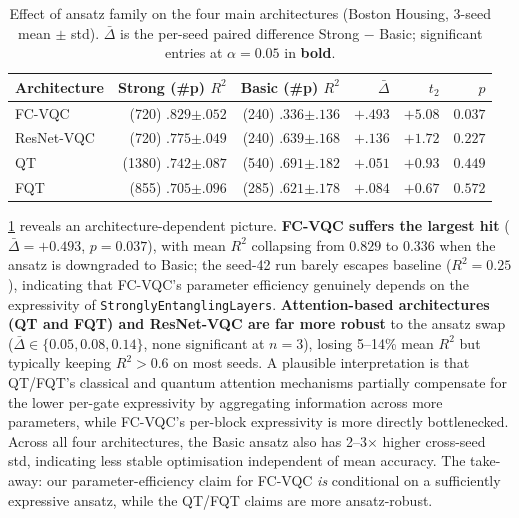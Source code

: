 \documentclass[10pt,conference]{IEEEtran}
\begin{document}
\begin{table}[t]
\centering
\caption{Effect of ansatz family on the four main architectures (Boston Housing, 3-seed mean $\pm$ std). $\bar{\Delta}$ is the per-seed paired difference Strong $-$ Basic; significant entries at $\alpha{=}0.05$ in \textbf{bold}.}
\label{tab:ansatz}
\small
\begin{tabular}{lrrrrr}
\toprule
Architecture & Strong (\#p) $R^2$ & Basic (\#p) $R^2$ & $\bar{\Delta}$ & $t_{2}$ & $p$ \\
\midrule
FC-VQC      & (720) $.829{\scriptstyle\pm.052}$ & (240) $.336{\scriptstyle\pm.136}$ & $\mathbf{+.493}$ & $\mathbf{+5.08}$ & $\mathbf{0.037}$ \\
ResNet-VQC  & (720) $.775{\scriptstyle\pm.049}$ & (240) $.639{\scriptstyle\pm.168}$ & $+.136$ & $+1.72$ & $0.227$ \\
QT          & (1380) $.742{\scriptstyle\pm.087}$ & (540) $.691{\scriptstyle\pm.182}$ & $+.051$ & $+0.93$ & $0.449$ \\
FQT         & (855) $.705{\scriptstyle\pm.096}$ & (285) $.621{\scriptstyle\pm.178}$ & $+.084$ & $+0.67$ & $0.572$ \\
\bottomrule
\end{tabular}
\vspace{-5pt}
\end{table}

\cref{tab:ansatz} reveals an architecture-dependent picture.
\textbf{FC-VQC suffers the largest hit} ($\bar{\Delta}{=}{+}0.493$, $p{=}0.037$), with mean $R^2$ collapsing from $0.829$ to $0.336$ when the ansatz is downgraded to Basic; the seed-42 run barely escapes baseline ($R^2{=}0.25$), indicating that FC-VQC's parameter efficiency genuinely depends on the expressivity of \texttt{StronglyEntanglingLayers}.
\textbf{Attention-based architectures (QT and FQT) and ResNet-VQC are far more robust} to the ansatz swap ($\bar{\Delta}\!\in\!\{0.05, 0.08, 0.14\}$, none significant at $n{=}3$), losing 5--14\% mean $R^2$ but typically keeping $R^2 > 0.6$ on most seeds.
A plausible interpretation is that QT/FQT's classical and quantum attention mechanisms partially compensate for the lower per-gate expressivity by aggregating information across more parameters, while FC-VQC's per-block expressivity is more directly bottlenecked.
Across all four architectures, the Basic ansatz also has 2--3${\times}$ higher cross-seed std, indicating less stable optimisation independent of mean accuracy.
The take-away: our parameter-efficiency claim for FC-VQC \emph{is} conditional on a sufficiently expressive ansatz, while the QT/FQT claims are more ansatz-robust.
\end{document}
